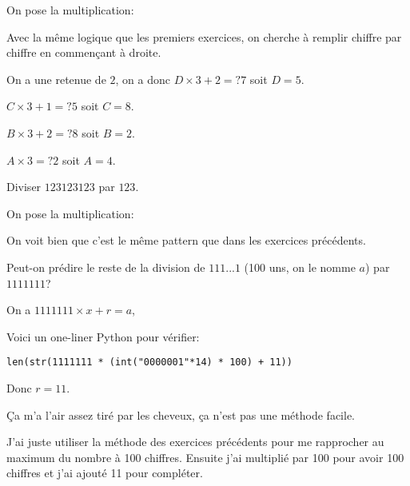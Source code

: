 \documentclass[fleqn,a4paper,nobib]{tufte-handout}
\begin{document}
\begin{solution}

    On pose la multiplication:
    

    Avec la même logique que les premiers exercices,
    on cherche à remplir chiffre par chiffre en
    commençant à droite.
    

    On a une retenue de $2$, on a donc $D\times3+2=?7$
    soit $D = 5$.
    

    $C\times3+1=?5$ soit $C = 8$.

    
    $B\times3+2=?8$ soit $B=2$.
    
    $A\times3=?2$ soit $A=4$. 

\end{solution}
    
    
    
\begin{exercise}
    Diviser $123123123$ par $123$.
\end{exercise}

\begin{solution}
    On pose la multiplication:


    On voit bien que c'est le même pattern que dans les
    exercices précédents.



\end{solution}


\begin{exercise}
    Peut-on prédire le reste de la division de
    $111...1$ (100 uns, on le nomme $a$) par $1111111$?
\end{exercise}


\begin{solution}
    On a $1111111\times x + r = a$,
    
    Voici un one-liner Python pour vérifier:
    
    \texttt{len(str(1111111 * (int("0000001"*14) * 100) + 11))}

    Donc $r = 11$.

    Ça m'a l'air assez tiré par les cheveux, ça n'est
    pas une méthode facile.

    J'ai juste utiliser la méthode des exercices précédents
    pour me rapprocher au maximum du nombre à 100 chiffres.
    Ensuite j'ai multiplié par 100 pour avoir 100 chiffres
    et j'ai ajouté 11 pour compléter.
\end{solution}
\end{document}
